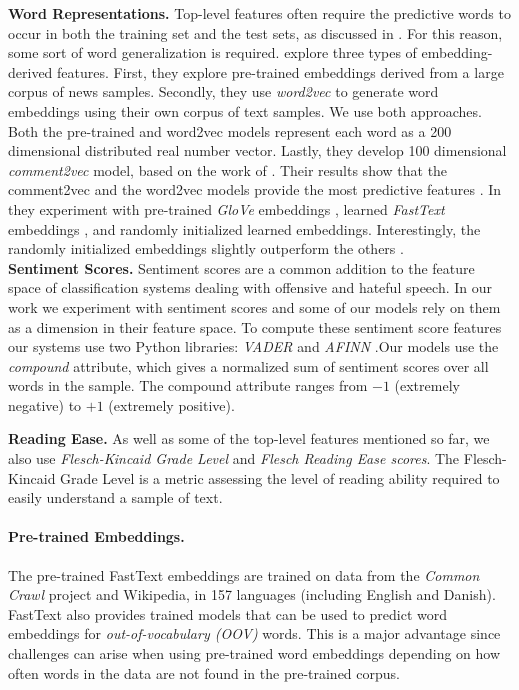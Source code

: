 \documentclass{article}
\begin{document}
\textbf{Word Representations.} Top-level features often require the predictive words to occur in both the training set and the test sets, as discussed in \cite{schmidt2017survey}. For this reason, some sort of word generalization is required. \cite{nobata2016abusive} explore three types of embedding-derived features. First, they explore pre-trained embeddings derived from a large corpus of news samples. Secondly, they use \textit{word2vec} \cite{word2vec} to generate word embeddings using their own corpus of text samples. We use both approaches. Both the pre-trained and word2vec models represent each word as a 200 dimensional distributed real number vector. Lastly, they develop 100 dimensional \textit{comment2vec} model, based on the work of \cite{le2014distributed}. Their results show that the comment2vec and the word2vec models provide the most predictive features \cite{nobata2016abusive}. In \cite{badjatiya2017deep} they experiment with pre-trained \textit{GloVe} embeddings \cite{glove}, learned \textit{FastText} embeddings \cite{fasttext}, and randomly initialized learned embeddings. Interestingly, the randomly initialized embeddings slightly outperform the others \cite{badjatiya2017deep}.\\ 

\textbf{Sentiment Scores.}\label{ssec:semanticScores}
Sentiment scores are a common addition to the feature space of classification systems dealing with offensive and hateful speech. In our work we experiment with sentiment scores and some of our models rely on them as a dimension in their feature space. To compute these sentiment score features our systems use two Python libraries: \textit{VADER} \cite{hutto2014vader} and \textit{AFINN} \cite{nielsen2011Afinn}.Our models use the \textit{compound} attribute, which gives a normalized sum of sentiment scores over all words in the sample. The compound attribute ranges from $-1$ (extremely negative) to $+1$ (extremely positive). 

\textbf{Reading Ease.}\label{ssec:linguisticFeatures}
As well as some of the top-level features mentioned so far, we also use \textit{Flesch-Kincaid Grade Level} and \textit{Flesch Reading Ease scores}. The Flesch-Kincaid Grade Level is a metric assessing the level of reading ability required to easily understand a sample of text.


\paragraph{Pre-trained Embeddings.} The pre-trained FastText \cite{fasttext} embeddings are trained on data from the \textit{Common Crawl} project and Wikipedia, in 157 languages (including English and Danish).  FastText also provides trained models that can be used to predict word embeddings for \textit{out-of-vocabulary (OOV)} words. This is a major advantage since  challenges can arise when using pre-trained word embeddings depending on how often words in the data are not found in the pre-trained corpus. 
\end{document}
